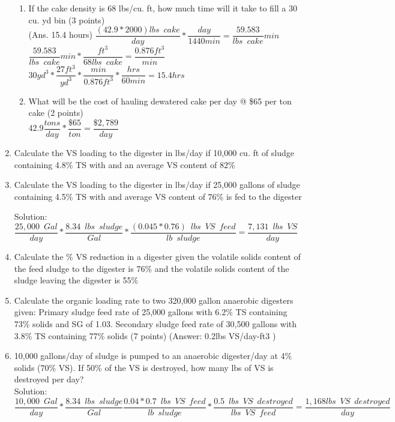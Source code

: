 \documentclass{article}
\begin{document}
\begin{enumerate}
\begin{enumerate}
\item If the cake density is 68 lbs/cu. ft, how much time will it take to fill a 30 cu. yd bin (3 points)\\
(Ans. 15.4 hours)
$\dfrac{(42.9*2000)lbs \enspace cake}{day}*\dfrac{day}{1440 min}=\dfrac{59.583}{lbs \enspace cake}{min}$\\
$\dfrac{59.583}{lbs \enspace cake}{min}*\dfrac{ft^3}{68 lbs \enspace cake}=\dfrac{0.876ft^3}{min}$\\
$30yd^3*\dfrac{27ft^3}{yd^3}*\dfrac{min}{0.876ft^3}*\dfrac{hrs}{60 min}=\boxed{15.4hrs}$
\vspace{2cm}
\item What will be the cost of hauling dewatered cake per day @ \$65 per ton cake (2 points)\\
42.9$\dfrac{tons}{day}*\dfrac{\$65}{ton}=\boxed{\dfrac{\$2,789}{day}}$ 
\end{enumerate}

\item Calculate the VS loading to the digester in lbs/day if 10,000 cu. ft of sludge containing 4.8\% TS with and an average VS content of 82\% 




\item Calculate the VS loading to the digester in lbs/day if 25,000 gallons of sludge containing 4.5\% TS with and average VS content of 76\% is fed to the digester 

Solution:\\
$\dfrac{25,000 \enspace Gal}{day}*\dfrac{8.34 \enspace lbs \enspace sludge}{Gal}* \dfrac{(0.045*0.76) \enspace lbs \enspace VS \enspace feed}{lb \enspace sludge}=\boxed{\dfrac{7,131 \enspace lbs \enspace VS }{day} } $


\item Calculate the \% VS reduction in a digester given the volatile solids content of the feed sludge to the digester is 76\% and the volatile solids content of the sludge leaving the digester is 55\% 




\item Calculate the organic loading rate to two 320,000 gallon anaerobic digesters given:
Primary sludge feed rate of 25,000 gallons with 6.2\% TS containing 73\% solids and SG of 1.03.
Secondary sludge feed rate of 30,500 gallons with 3.8\% TS containing 77\% solids (7 points)
(Answer: 0.2lbs VS/day-ft3 ) 

\item 10,000 gallons/day of sludge is pumped to an anaerobic digester/day at 4\% solids (70\% VS).  If 50\% of the VS is destroyed, how many lbs of VS is destroyed per day?\\
Solution:\\
$\dfrac{10,000 \enspace Gal}{day}*\dfrac{8.34 \enspace lbs \enspace sludge}{Gal} \dfrac{0.04*0.7 \enspace lbs \enspace VS \enspace feed}{lb \enspace sludge}*\dfrac{0.5 \enspace lbs \enspace VS \enspace destroyed}{lbs \enspace VS \enspace feed}=\boxed{\dfrac{1,168lbs \enspace VS \enspace destroyed}{day} } $


\end{enumerate}
\end{document}

